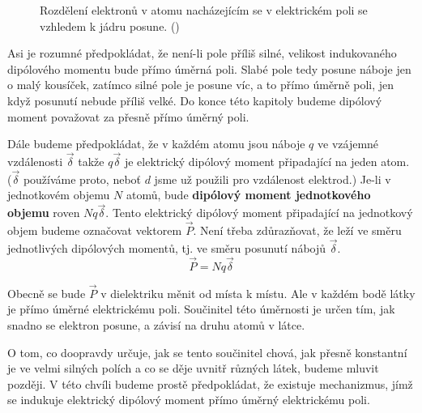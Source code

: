     \begin{figure}[ht!]
      \centering
      \label{fyz:fig708}
      \caption{Rozdělení elektronů v atomu nacházejícím se v elektrickém poli se vzhledem k jádru
              posune. (\cite[s.~177]{Feynman02})}
    \end{figure}

    Asi je rozumné předpokládat, že není-li pole příliš silné, velikost indukovaného dipólového
    momentu bude přímo úměrná poli. Slabé pole tedy posune náboje jen o malý kousíček, zatímco silné
    pole je posune víc, a to přímo úměrně poli, jen když posunutí nebude příliš velké. Do konce této
    kapitoly budeme dipólový moment považovat za přesně přímo úměrný poli.

    Dále budeme předpokládat, že v každém atomu jsou náboje \(q\) ve vzájemné vzdálenosti
    \(\vec{δ}\) takže \(q\vec{δ}\) je elektrický dipólový moment připadající na jeden atom.
    (\(\vec{δ}\) používáme proto, neboť \(d\) jsme už použili pro vzdálenost elektrod.) Je-li v
    jednotkovém objemu \(N\) atomů, bude \textbf{dipólový moment jednotkového objemu} roven
    \(Nq\vec{δ}\). Tento elektrický dipólový moment připadající na jednotkový objem budeme označovat
    vektorem \(\vec{P}\). Není třeba zdůrazňovat, že leží ve směru jednotlivých dipólových momentů,
    tj. ve směru posunutí nábojů \(\vec{δ}\).
    \begin{equation}\label{fyz:eq910}
      \vec{P} = Nq\vec{δ}
    \end{equation}

    Obecně se bude \(\vec{P}\) v dielektriku měnit od místa k místu. Ale v každém bodě látky je
    přímo úměrné elektrickému poli. Součinitel této úměrnosti je určen tím, jak snadno se elektron
    posune, a závisí na druhu atomů v látce.
    
    O tom, co doopravdy určuje, jak se tento součinitel chová, jak přesně konstantní je ve velmi
    silných polích a co se děje uvnitř různých látek, budeme mluvit později. V této chvíli budeme
    prostě předpokládat, že existuje mechanizmus, jímž se indukuje elektrický dipólový moment přímo
    úměrný elektrickému poli.

